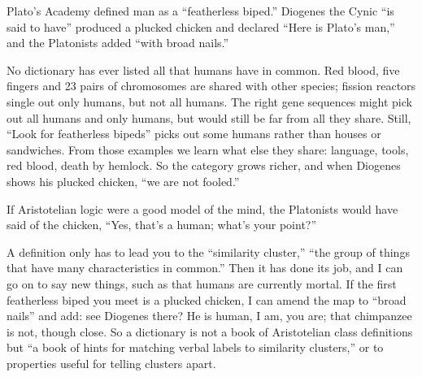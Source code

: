 
Plato's Academy defined man as a ``featherless biped.'' Diogenes the Cynic ``is said to have'' produced a plucked chicken and declared ``Here is Plato's man,'' and the Platonists added ``with broad nails.'' 

No dictionary has ever listed all that humans have in common. Red blood, five fingers and 23 pairs of chromosomes are shared with other species; fission reactors single out only humans, but not all humans. The right gene sequences might pick out all humans and only humans, but would still be far from all they share. Still, ``Look for featherless bipeds'' picks out some humans rather than houses or sandwiches. From those examples we learn what else they share: language, tools, red blood, death by hemlock. So the category grows richer, and when Diogenes shows his plucked chicken, ``we are not fooled.''

If Aristotelian logic were a good model of the mind, the Platonists would have said of the chicken, ``Yes, that's a human; what's your point?'' 

A definition only has to lead you to the ``similarity cluster,'' ``the group of things that have many characteristics in common.'' Then it has done its job, and I can go on to say new things, such as that humans are currently mortal. If the first featherless biped you meet is a plucked chicken, I can amend the map to ``broad nails'' and add: see Diogenes there? He is human, I am, you are; that chimpanzee is not, though close.  So a dictionary is not a book of Aristotelian class definitions but ``a book of hints for matching verbal labels to similarity clusters,'' or to properties useful for telling clusters apart.
